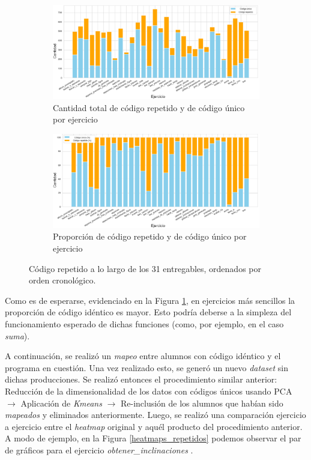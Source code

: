 \documentclass[11pt,a4paper,twoside,openany]{tesis}
\begin{document}
\begin{figure}[H]
    \centering
    \begin{subfigure}{0.45\textwidth}
        \includegraphics[width=\linewidth]{imagenes/unique-1.png}
        \caption{Cantidad total de código repetido y de código único por ejercicio}
    \end{subfigure}
    \hfill
    \begin{subfigure}{0.45\textwidth}
        \includegraphics[width=\linewidth]{imagenes/unique-2.png}
        \caption{Proporción de código repetido y de código único por ejercicio}
    \end{subfigure}
    \caption{Código repetido a lo largo de los 31 entregables, ordenados por orden cronológico. }
    \label{repetidos}
\end{figure}

Como es de esperarse, evidenciado en la Figura \ref{repetidos}, en ejercicios más sencillos la proporción de código idéntico es mayor. Esto podría deberse a la simpleza del funcionamiento esperado de dichas funciones (como, por ejemplo, en el caso \emph{suma}).

A continuación, se realizó un \emph{mapeo} entre alumnos con código idéntico y el programa en cuestión. Una vez realizado esto, se generó un nuevo \emph{dataset} sin dichas producciones. Se realizó entonces el procedimiento similar anterior: Reducción de la dimensionalidad de los datos con códigos únicos usando PCA $\rightarrow$ Aplicación de \emph{Kmeans} $\rightarrow$ Re-inclusión de los alumnos que habían sido \emph{mapeados} y eliminados anteriormente. Luego, se realizó una comparación ejercicio a ejercicio entre el \emph{heatmap} original y aquél producto del procedimiento anterior. A modo de ejemplo, en la Figura \ref{heatmaps_repetidos} podemos observar el par de gráficos para el ejercicio \emph{obtener\_inclinaciones} .
\end{document}
